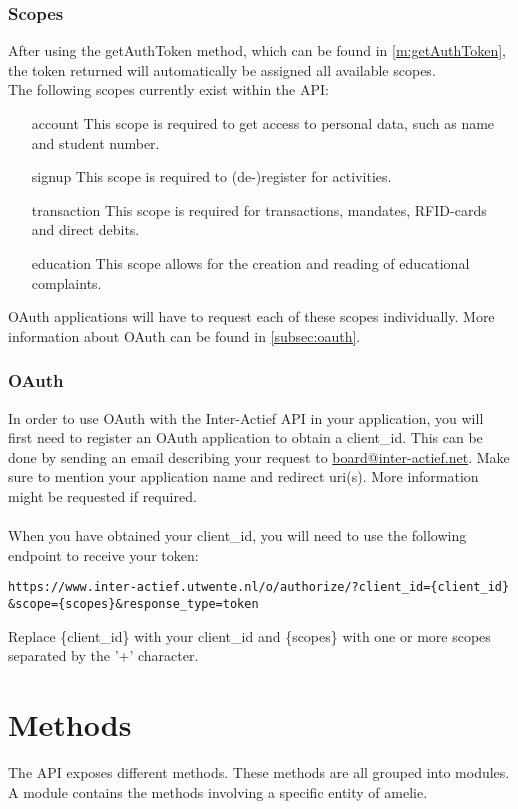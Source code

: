\documentclass[a4paper]{scrreprt}
\begin{document}
\subsection{Scopes}
After using the getAuthToken method, which can be found in \autoref{m:getAuthToken}, the token returned will automatically be assigned all available scopes.\\
The following scopes currently exist within the API:
\begin{enumerate}
\item[account] This scope is required to get access to personal data, such as name and student number.
\item[signup] This scope is required to (de-)register for activities.
\item[transaction] This scope is required for transactions, mandates, RFID-cards and direct debits.
\item[education] This scope allows for the creation and reading of educational complaints.
\end{enumerate}
OAuth applications will have to request each of these scopes individually. More information about OAuth can be found in \autoref{subsec:oauth}.

\subsection{OAuth}\label{subsec:oauth}
In order to use OAuth with the Inter-Actief API in your application, you will first need to register an OAuth application to obtain a client\_id. This can be done by sending an email describing your request to \href{mailto:board@inter-actief.net}{board@inter-actief.net}. Make sure to mention your application name and redirect uri(s). More information might be requested if required.\\\\
When you have obtained your client\_id, you will need to use the following endpoint to receive your token:
\begin{lstlisting}
https://www.inter-actief.utwente.nl/o/authorize/?client_id={client_id}
&scope={scopes}&response_type=token
\end{lstlisting}
Replace \{client\_id\} with your client\_id and \{scopes\} with one or more scopes separated by the '+' character.


\clearpage
\chapter{Methods}
The API exposes different methods. These methods are all grouped into modules. A module contains the methods involving a specific entity of amelie.
\end{document}
